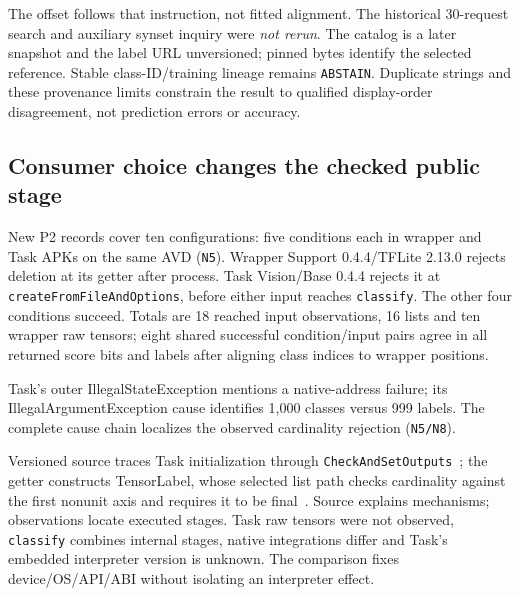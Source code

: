 \documentclass[10pt,conference]{IEEEtran}
\newcommand{\code}[1]{\texttt{#1}}
\begin{document}
The offset follows that instruction, not fitted alignment. The historical 30-request search and auxiliary synset inquiry were \emph{not rerun}. The catalog is a later snapshot and the label URL unversioned; pinned bytes identify the selected reference. Stable class-ID/training lineage remains \code{ABSTAIN}. Duplicate strings and these provenance limits constrain the result to qualified display-order disagreement, not prediction errors or accuracy.

\subsection{Consumer choice changes the checked public stage}
\label{sec:consumers}
New P2 records cover ten configurations: five conditions each in wrapper and Task APKs on the same AVD (\code{N5}). Wrapper Support 0.4.4/TFLite 2.13.0 rejects deletion at its getter after process. Task Vision/Base 0.4.4 rejects it at \code{createFromFileAndOptions}, before either input reaches \code{classify}. The other four conditions succeed. Totals are 18 reached input observations, 16 lists and ten wrapper raw tensors; eight shared successful condition/input pairs agree in all returned score bits and labels after aligning class indices to wrapper positions.

Task's outer IllegalStateException mentions a native-address failure; its IllegalArgumentException cause identifies 1,000 classes versus 999 labels. The complete cause chain localizes the observed cardinality rejection (\code{N5/N8}).

Versioned source traces Task initialization through \code{CheckAndSetOutputs}~\cite{task-classifier}; the getter constructs TensorLabel, whose selected list path checks cardinality against the first nonunit axis and requires it to be final~\cite{tensorlabel}. Source explains mechanisms; observations locate executed stages. Task raw tensors were not observed, \code{classify} combines internal stages, native integrations differ and Task's embedded interpreter version is unknown. The comparison fixes device/OS/API/ABI without isolating an interpreter effect.
\end{document}
